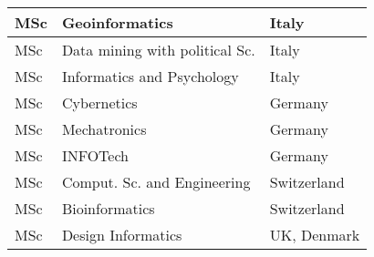 {\begin{table}[h]
\begin{center}
\begin{tabular}  {|l|l|l|}
\hline
MSc & Geoinformatics   & Italy\\
\hline
MSc & Data mining with political Sc.  &  Italy\\
\hline
MSc&  Informatics and Psychology   &  Italy\\
\hline
MSc & Cybernetics  &  Germany\\
\hline
MSc & Mechatronics   & Germany\\
\hline
MSc & INFOTech   & Germany\\
\hline
MSc & Comput. Sc. and Engineering & Switzerland\\
\hline
MSc& Bioinformatics  & Switzerland\\
\hline
MSc & Design Informatics    & UK, Denmark\\
\hline
\end{tabular}
\end{center}
\label{ tab:joint}
\end{table}
}
